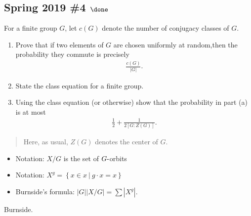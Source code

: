 \hypertarget{spring-2019-4-done}{%
\subsection{\texorpdfstring{Spring 2019 \#4
\(\done\)}{Spring 2019 \#4 \textbackslash done}}\label{spring-2019-4-done}}

For a finite group \(G\), let \(c(G)\) denote the number of conjugacy
classes of \(G\).

\begin{enumerate}
\def\labelenumi{\alph{enumi}.}
\item
  Prove that if two elements of \(G\) are chosen uniformly at
  random,then the probability they commute is precisely
  \begin{align*}
  \frac{c(G)}{{\left\lvert {G} \right\rvert}}
  .\end{align*}
\item
  State the class equation for a finite group.
\item
  Using the class equation (or otherwise) show that the probability in
  part (a) is at most
  \begin{align*}
  \frac 1 2 + \frac 1 {2[G : Z(G)]}
  .\end{align*}
\end{enumerate}

\begin{quote}
Here, as usual, \(Z(G)\) denotes the center of \(G\).
\end{quote}

\begin{concept}

\envlist

\begin{itemize}
\tightlist
\item
  Notation: \(X/G\) is the set of \(G{\hbox{-}}\)orbits
\item
  Notation:
  \(X^g = \left\{{x\in x{~\mathrel{\Big|}~}g\cdot x = x}\right\}\)
\item
  Burnside's formula:
  \({\left\lvert {G} \right\rvert} {\left\lvert {X/G} \right\rvert} = \sum {\left\lvert {X^g} \right\rvert}\).
\end{itemize}

\end{concept}

\begin{strategy}

Burnside.

\end{strategy}

